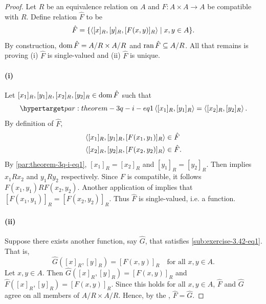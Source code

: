 \documentclass{report}
\begin{document}
  \begin{proof}
    Let $R$ be an equivalence relation on $A$ and
      $F \colon A \times A \rightarrow A$ be compatible with $R$.
    Define relation $\hat{F}$ to be
      $$\hat{F} = \{\left< [x]_R, [y]_R, [F(x, y)]_R \right> \mid x, y \in A\}.$$
    By construction, $\mathop{\text{dom}}{\hat{F}} = A / R \times A / R$ and
      $\mathop{\text{ran}}{\hat{F}} \subseteq A / R$.
    All that remains is proving (i) $\hat{F}$ is single-valued and (ii)
      $\hat{F}$ is unique.

    \paragraph{(i)}%

      Let $[x_1]_R, [y_1]_R, [x_2]_R, [y_2]_R \in \mathop{\text{dom}}{\hat{F}}$ such that
        \begin{equation}
          \hyperlabel{par:theorem-3q-i-eq1}
          \tuple{[x_1]_R, [y_1]_R} = \tuple{[x_2]_R, [y_2]_R}.
        \end{equation}
      By definition of $\hat{F}$,
        \begin{align*}
          \left< [x_1]_R, [y_1]_R, [F(x_1, y_1)]_R \right> & \in \hat{F} \\
          \left< [x_2]_R, [y_2]_R, [F(x_2, y_2)]_R \right> & \in \hat{F}.
        \end{align*}
      By \eqref{par:theorem-3q-i-eq1}, $[x_1]_R = [x_2]_R$ and
        $[y_1]_R = [y_2]_R$.
      Then  implies $x_1Rx_2$ and $y_1Ry_2$ respectively.
      Since $F$ is compatible, it follows $F(x_1, y_1)RF(x_2, y_2)$.
      Another application of  implies that
        $[F(x_1, y_1)]_R = [F(x_2, y_2)]_R$.
      Thus $\hat{F}$ is single-valued, i.e. a function.

    \paragraph{(ii)}%

      Suppose there exists another function, say $\hat{G}$, that satisfies
        \eqref{sub:exercise-3.42-eq1}.
      That is,
        $$\hat{G}([x]_R, [y]_R) = [F(x, y)]_R \quad\text{for all } x, y \in A.$$
      Let $x, y \in A$.
      Then $\hat{G}([x]_R, [y]_R) = [F(x, y)]_R$ and
        $\hat{F}([x]_R, [y]_R) = [F(x, y)]_R$.
      Since this holds for all $x, y \in A$, $\hat{F}$ and $\hat{G}$ agree on
        all members of $A / R \times A / R$.
      Hence, by the , $\hat{F} = \hat{G}$.


\end{proof}
\end{document}
